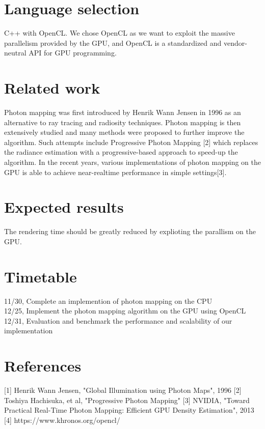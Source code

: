 \documentclass{acm_proc_article-sp}
\begin{document}
\section{Language selection}
C++ with OpenCL. We chose OpenCL as we want to exploit the massive parallelism provided by the GPU, and OpenCL is a standardized and vendor-neutral API for GPU programming.
\section{Related work}
Photon mapping was first introduced by Henrik Wann Jensen in 1996 as an alternative to ray tracing and radiosity techniques. Photon mapping is then extensively studied and many methods were proposed to further improve the algorithm. Such attempts include Progressive Photon Mapping [2] which replaces the radiance estimation with a progressive-based approach to speed-up the algorithm. In the recent years, various implementations of photon mapping on the GPU is able to achieve near-realtime performance in simple settings[3].
\section{Expected results}
The rendering time should be greatly reduced by explioting the parallism on the GPU.
\section{Timetable}
11/30, Complete an implemention of photon mapping on the CPU\\
12/25, Implement the photon mapping algorithm on the GPU using OpenCL\\
12/31, Evaluation and benchmark the performance and scalability of our implementation\\
\section{References}
[1] Henrik Wann Jensen, "Global Illumination using Photon Maps", 1996 {\newline}
[2] Toshiya Hachisuka, et al, "Progressive Photon Mapping" {\newline}
[3] NVIDIA, "Toward Practical Real-Time Photon Mapping: Efficient GPU Density Estimation", 2013 {\newline}
[4] https://www.khronos.org/opencl/ {\newline}
\end{document}
